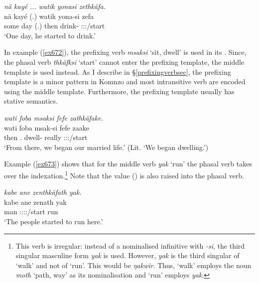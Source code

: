 \begin{exe}
	\ex \emph{nä kayé ... watik yonasi zethkäfa.}\\
	\gll nä kayé (.) watik yona-si zefa\\
	some day (.) then drink-\Nmlz{} \Sg:\Sbj:\Pst:\Pfv/start\\
	\trans `One day, he started to drink.'
	\label{ex674}
\end{exe}

In example (\ref{ex672}), the prefixing verb \emph{msaksi} `sit, dwell' is used in its . Since, the phasal verb \emph{thkäfksi} `start' cannot enter the prefixing template, the middle template is used instead. As I describe in \S{}\ref{prefixingverbsec}, the prefixing template is a minor pattern in Komnzo and most intransitive verb are encoded using the middle template. Furthermore, the prefixing template usually has stative semantics.

\begin{exe}
	\ex \emph{wati foba msaksi fefe zathkäfake.}\\
	\gll wati foba msak-si fefe zaake\\
	then \Dist.\Abl{} dwell-\Nmlz{} really \Fdu:\Sbj:\Pst:\Pfv/start\\
	\trans `From there, we began our married life.' (Lit. `We began dwelling.')\\
	\label{ex672}
\end{exe}

Example (\ref{ex673}) shows that for the middle verb \emph{yak} `run' the phasal verb takes over the indexation.\footnote{This verb is irregular: instead of a nominalised infinitive with \emph{-si}, the third singular masculine form \emph{yak} is used. However, \emph{yak} is the third singular of `walk' and not of `run'. This would be \emph{ŋakwir}. Thus, `walk' employs the noun \emph{moth} `path, way' as its nominalisation and `run' employs \emph{yak}.} Note that the  value (\Venit) is also raised into the phasal verb.

\begin{exe}
	\ex \emph{kabe ane zenthkäfath yak.}\\
	\gll kabe ane zenath yak\\
	man \Dem{} \Stpl:\Sbj:\Pst:\Pfv:\Venit/start run\\
	\trans `The people started to run here.'
	\label{ex673}
\end{exe}

